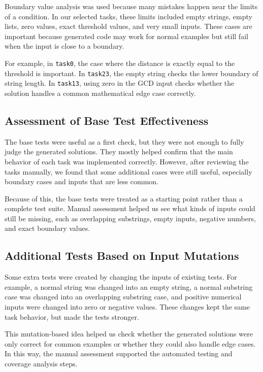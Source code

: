 \documentclass[journal]{IEEEtran}
\begin{document}
Boundary value analysis was used because many mistakes happen near the limits of a condition. In our selected tasks, these limits included empty strings, empty lists, zero values, exact threshold values, and very small inputs. These cases are important because generated code may work for normal examples but still fail when the input is close to a boundary.

For example, in \texttt{task0}, the case where the distance is exactly equal to the threshold is important. In \texttt{task23}, the empty string checks the lower boundary of string length. In \texttt{task13}, using zero in the GCD input checks whether the solution handles a common mathematical edge case correctly.

\subsection{Assessment of Base Test Effectiveness}

The base tests were useful as a first check, but they were not enough to fully judge the generated solutions. They mostly helped confirm that the main behavior of each task was implemented correctly. However, after reviewing the tasks manually, we found that some additional cases were still useful, especially boundary cases and inputs that are less common.

Because of this, the base tests were treated as a starting point rather than a complete test suite. Manual assessment helped us see what kinds of inputs could still be missing, such as overlapping substrings, empty inputs, negative numbers, and exact boundary values.

\subsection{Additional Tests Based on Input Mutations}

Some extra tests were created by changing the inputs of existing tests. For example, a normal string was changed into an empty string, a normal substring case was changed into an overlapping substring case, and positive numerical inputs were changed into zero or negative values. These changes kept the same task behavior, but made the tests stronger.

This mutation-based idea helped us check whether the generated solutions were only correct for common examples or whether they could also handle edge cases. In this way, the manual assessment supported the automated testing and coverage analysis steps.
\end{document}
